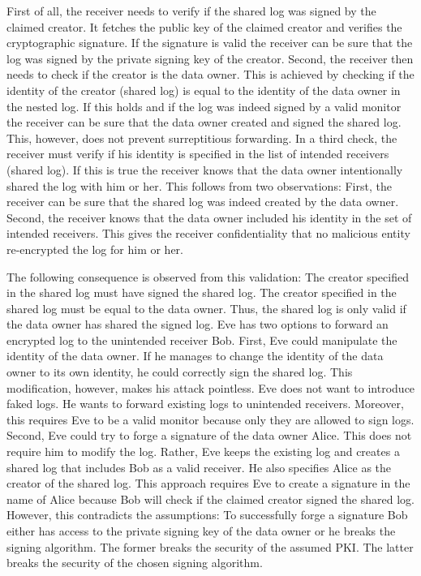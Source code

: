\documentclass[../main.tex]{subfiles}
\begin{document}
First of all, the receiver needs to verify if the shared log was signed by the claimed creator.
It fetches the public key of the claimed creator and verifies the cryptographic signature.
If the signature is valid the receiver can be sure that the log was signed by the private signing key of the creator.
Second, the receiver then needs to check if the creator is the data owner. 
This is achieved by checking if the identity of the creator (shared log) is equal to the identity of the data owner in the nested log.
If this holds and if the log was indeed signed by a valid monitor the receiver can be sure that the data owner created and signed the shared log.
This, however, does not prevent surreptitious forwarding.
In a third check, the receiver must verify if his identity is specified in the list of intended receivers (shared log).
If this is true the receiver knows that the data owner intentionally shared the log with him or her.
This follows from two observations:
First, the receiver can be sure that the shared log was indeed created by the data owner.
Second, the receiver knows that the data owner included his identity in the set of intended receivers.
This gives the receiver confidentiality that no malicious entity re-encrypted the log for him or her.

The following consequence is observed from this validation:
The creator specified in the shared log must have signed the shared log.
The creator specified in the shared log must be equal to the data owner.
Thus, the shared log is only valid if the data owner has shared the signed log.
Eve has two options to forward an encrypted log to the unintended receiver Bob. 
First, Eve could manipulate the identity of the data owner.
If he manages to change the identity of the data owner to its own identity, he could correctly sign the shared log.
This modification, however, makes his attack pointless.
Eve does not want to introduce faked logs.
He wants to forward existing logs to unintended receivers.
Moreover, this requires Eve to be a valid monitor because only they are allowed to sign logs.
Second, Eve could try to forge a signature of the data owner Alice.
This does not require him to modify the log.
Rather, Eve keeps the existing log and creates a shared log that includes Bob as a valid receiver.
He also specifies Alice as the creator of the shared log.
This approach requires Eve to create a signature in the name of Alice because Bob will check if the claimed creator signed the shared log.
However, this contradicts the assumptions:
To successfully forge a signature Bob either has access to the private signing key of the data owner or he breaks the signing algorithm.
The former breaks the security of the assumed PKI.
The latter breaks the security of the chosen signing algorithm.
\end{document}
